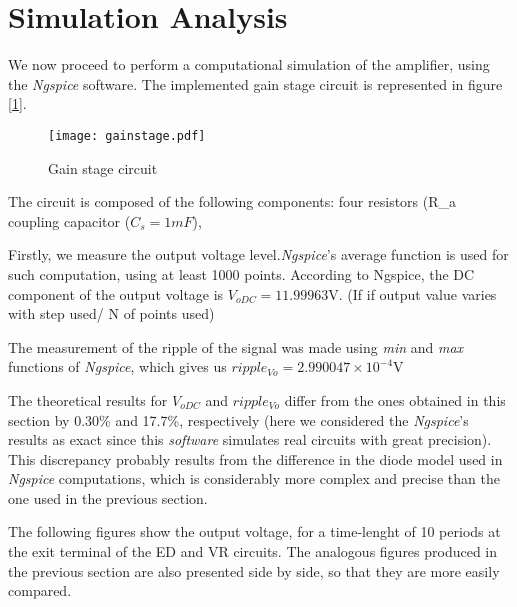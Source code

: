 \section{Simulation Analysis}
\label{sec:simulation}

\par We now proceed to perform a computational simulation of the amplifier, using the \textit{Ngspice} software. The implemented gain stage circuit is represented in figure [\ref{fig:gain_stage}].

\vspace{-2cm}
\begin{figure}[H]
\centering
  \texttt{[image: gainstage.pdf]}
  \caption{Gain stage circuit}
  \label{fig:gain_stage}
\end{figure}%

\par The circuit is composed of the following components: four resistors (R_a coupling capacitor ($C_s = 1 mF$), 

Firstly, we measure the output voltage level.\textit{Ngspice}'s average function is used for such computation, using at least 1000 points. According to Ngspice, the DC component of the output voltage
is $V_{oDC}=11.99963$V. (If if output value varies with step used/ N of points used)\par
The measurement of the ripple of the signal was made using \textit{min} and \textit{max} functions of \textit{Ngspice}, which gives us $ripple_{Vo}=2.990047 \times 10^{-4}$V

The theoretical results for $V_{oDC}$ and $ripple_{Vo}$ differ from the ones obtained in this section  by 0.30\% and 17.7\%, respectively (here we considered the \textit{Ngspice}'s results as exact since this \textit{software} simulates real circuits with great precision).
This discrepancy probably results from the difference in the diode model used in \textit{Ngspice} computations, which is considerably more complex and precise than the one used in the previous section.

The following figures show the output voltage, for a time-lenght of 10 periods at the exit terminal of the ED and VR circuits.  The analogous figures produced in the previous section are also presented side by side, so that they are more easily compared.

